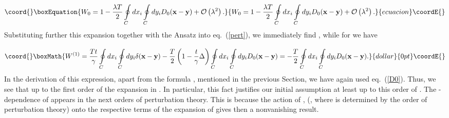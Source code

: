 \documentclass[a4paper,12pt]{article}
\begin{document}
\begin{equation}\coord{}\boxEquation{
\label{W0}
W_0=1-\frac{\lambda T}{2}\oint\limits_{C}^{}dx_i\oint\limits_{C}^{}dy_iD_0({\bf x}-{\bf y})+{\cal O}\left(\lambda^2\right).
}{
W_0=1-\frac{\lambda T}{2}\oint\limits_{C}^{}dx_i\oint\limits_{C}^{}dy_iD_0({\bf x}-{\bf y})+{\cal O}\left(\lambda^2\right).
}{ecuacion}\coordE{}\end{equation}
Substituting further this expansion
together with the Ansatz \coordHE{} into eq.~(\ref{pert}), we immediately find \coordHE{},
while for \coordHE{} we have

$$\coord{}\boxMath{
W^{(1)}=\frac{Tt}{\gamma}\oint\limits_{C}^{}dx_i
\oint\limits_{C}^{}dy_i\delta({\bf x}-{\bf y})-\frac{T}{2}\left(1-\frac{t}{\gamma}\Delta\right)
\oint\limits_{C}^{}dx_i\oint\limits_{C}^{}dy_iD_0({\bf x}-{\bf y})=
-\frac{T}{2}\oint\limits_{C}^{}dx_i\oint\limits_{C}^{}dy_iD_0({\bf x}-{\bf y}).}{dollar}{0pt}\coordE{}$$
In the derivation of this expression, apart from the formula
\coordHE{}, mentioned in the previous Section, we have again used
eq.~(\ref{D0}).
Thus, we see that \coordHE{} up to the first order of the expansion in \myHighlight{$\lambda$}\coordHE{}. In particular,
this fact justifies our initial assumption \coordHE{} at least up to this order of \myHighlight{$\lambda$}\coordHE{}.
The \coordHE{}-dependence of \coordHE{} appears in the next orders of perturbation theory. This is because the action of \coordHE{},
(\coordHE{}, where \coordHE{} is determined by the order of perturbation theory)
onto the respective terms of the expansion of \coordHE{} gives then a nonvanishing result.
\end{document}
